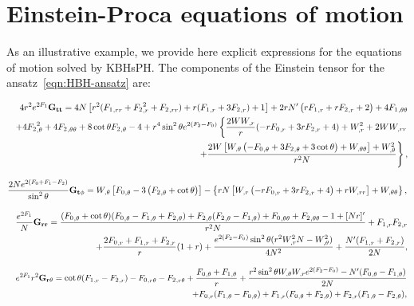 \chapter{Einstein-Proca equations of motion}
\label{appendixb}



As an illustrative example, we provide here explicit expressions for the equations of motion solved by KBHsPH. The components of the Einstein tensor for the ansatz~\eqref{eqn:HBH-ansatz} are:

\begin{eqnarray}
&&  4r^2  e^{2F_1}{\bf G_{tt}}= 4 
N \left[r^2 ({F_1}_{,rr}+ {F_2}_{,r}^2+
{F_2}_{,rr})
+r( 
{F_1}_{,r}+3  {F_2}_{,r})+1\right] + 2 r N'  \left(r 
{F_1}_{,r}+r {F_2}_{,r}+2\right)+4 {F_1}_{,\theta\theta}\nonumber \\
%
&& +4  
{F_2}_{,\theta}^2+4  {F_2}_{,\theta\theta}
%
+8
\cot \theta {F_2}_{,\theta}-4 
%
 +r^4 \sin ^2\theta e^{2 ({F_2}-F_0)} 
 \left\{
 \frac{2W W_{,r}}{r}(- r {F_0}_{,r} +3r{F_2}_{,r}+4 )
 +W_{,r}^2+2W W_{,rr} 
 \right. \nonumber \\ 
%
&& \left. + \frac{2 W \left[W_{,\theta} \left(- 
{F_0}_{,\theta}+3 {F_2}_{,\theta}+3 \cot\theta\right)+ W_{,\theta\theta}\right]+ W_{,\theta}^2}{r^2N} \right\},
\end{eqnarray}

\begin{equation}
\frac{2Ne^{2(F_0+F_1-F_2)}}{\sin^2\theta}{\bf G_{t\phi }}=   W_{,\theta} \left[ {F_0}_{,\theta}-3 \left( 
{F_2}_{,\theta}+\cot\theta\right)\right]- \left\{r N 
\left[W_{,r} \left(-r {F_0}_{,r}+3 r 
{F_2}_{,r}+4\right)+r 
W_{,rr}\right]+W_{,\theta\theta}\right\}  ,
\end{equation}



\begin{eqnarray}
&&  \frac{e^{2F_1}}{N}{\bf G_{rr}}= \frac{({F_0}_{,\theta}+\cot\theta)({F_0}_{,\theta}-{F_1}_{,\theta}+
{F_2}_{,\theta})+{F_2}_{,\theta}({F_2}_{,\theta}-{F_1}_{,\theta})
+{F_0}_{,\theta\theta}+{F_2}_{,\theta\theta}-1+[Nr]'}{r^2 N}+{F_1}_{,r} {F_2}_{,r}\nonumber \\
&& 
%
+\frac{2{F_0}_{,r}+{F_1}_{,r}+{F_2}_{,r}}{r}(1+r)+\frac{e^{2(
{F_2}- {F_0})} \sin ^2\theta (r^2W_{,r}^2N-W_{,\theta}^2 ) }{4 N^2} 
%
+\frac{N'( 
{F_1}_{,r}+{F_2}_{,r})}{2N},
\end{eqnarray}


\begin{eqnarray}
 && e^{2F_1}r^2{\bf G_{r\theta}}=
\cot\theta (
{F_1}_{,r} -{F_2}_{,r} )-{F_0}_{,r\theta}-{F_2}_{,r\theta}+\frac{{F_0}_{,\theta}+{F_1}_{,\theta}}{r}+\frac{r^2 \sin ^2\theta 
W_{,\theta} W_{,r} e^{2( {F_2}- {F_0})}-N'( {F_0}_{,\theta}-{F_1}_{,\theta})}{2 
N} \nonumber \\ 
&& + {F_0}_{,r} ({F_1}_{,\theta}-{F_0}_{,\theta})+
{F_1}_{,r}({F_0}_{,\theta}+{F_2}_{,\theta} )+{F_2}_{,r}( {F_1}_{,\theta}- {F_2}_{,\theta} ),
\end{eqnarray}




